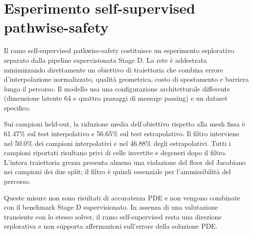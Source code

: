 \section{Esperimento self-supervised pathwise-safety}
\label{app:selfsup}

Il ramo self-supervised pathwise-safety costituisce un esperimento esplorativo separato dalla pipeline supervisionata Stage D. La rete è addestrata minimizzando direttamente un obiettivo di traiettoria che combina errore d'interpolazione normalizzato, qualità geometrica, costo di spostamento e barriera lungo il percorso. Il modello usa una configurazione architetturale differente (dimensione latente 64 e quattro passaggi di message passing) e un dataset specifico.

Sui campioni held-out, la riduzione media dell'obiettivo rispetto alla mesh fissa è 61.47\% sul test interpolativo e 56.65\% sul test estrapolativo. Il filtro interviene nel 50.0\% dei campioni interpolativi e nel 46.88\% degli estrapolativi. Tutti i campioni riportati risultano privi di celle invertite e degeneri dopo il filtro. L'intera traiettoria grezza presenta almeno una violazione del floor del Jacobiano nei campioni dei due split; il filtro è quindi essenziale per l'ammissibilità del percorso.

Queste misure non sono risultati di accuratezza PDE e non vengono combinate con il benchmark Stage D supervisionato. In assenza di una valutazione transiente con lo stesso solver, il ramo self-supervised resta una direzione esplorativa e non supporta affermazioni sull'errore della soluzione PDE.
